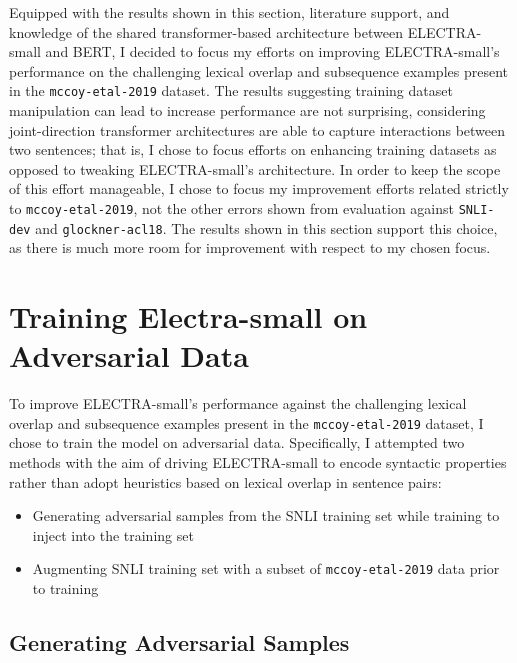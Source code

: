 \documentclass[11pt,a4paper]{article}
\begin{document}
Equipped with the results shown in this section, literature support, and knowledge of the shared transformer-based architecture between ELECTRA-small and BERT, I decided to focus my efforts on improving ELECTRA-small's performance on the challenging lexical overlap and subsequence examples present in the \texttt{mccoy-etal-2019} dataset. The results suggesting training dataset manipulation can lead to increase performance are not surprising, considering joint-direction transformer architectures are able to capture interactions between two sentences; that is, I chose to focus efforts on enhancing training datasets as opposed to tweaking ELECTRA-small's architecture. In order to keep the scope of this effort manageable, I chose to focus my improvement efforts related strictly to \texttt{mccoy-etal-2019}, not the other errors shown from evaluation against \texttt{SNLI-dev} and \texttt{glockner-acl18}. The results shown in this section support this choice, as there is much more room for improvement with respect to my chosen focus.

\section{Training Electra-small on Adversarial Data}

To improve ELECTRA-small's performance against the challenging lexical overlap and subsequence examples present in the \texttt{mccoy-etal-2019} dataset, I chose to train the model on adversarial data. Specifically, I attempted two methods with the aim of driving ELECTRA-small to encode syntactic properties rather than adopt heuristics based on lexical overlap in sentence pairs:

\begin{itemize}
\item Generating adversarial samples from the SNLI training set while training to inject into the training set
\item Augmenting SNLI training set with a subset of \texttt{mccoy-etal-2019} data prior to training
\end{itemize}

\subsection{Generating Adversarial Samples}
\end{document}
